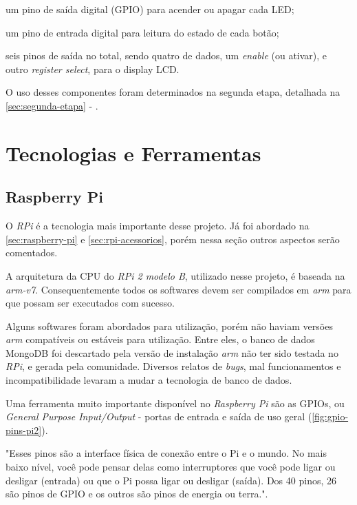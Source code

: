 \documentclass[
		12pt,				%
		openright,			%
		oneside,			%
		a4paper,			%
		chapter=TITLE,		%
		english,			%
		brazil				%
	]{abntex2}
\begin{document}
\begin{alineas}
	\item um pino de saída digital (GPIO) para acender ou apagar cada LED;
	\item um pino de entrada digital para leitura do estado de cada botão;
	\item seis pinos de saída no total, sendo quatro de dados, um \textit{enable} (ou ativar), e outro \textit{register select}, para o display LCD.
\end{alineas}

O uso desses componentes foram determinados na segunda etapa, detalhada na \autoref{sec:segunda-etapa} - .


\section{Tecnologias e Ferramentas}\label{sec:tecnologias-ferramentas}


\subsection{Raspberry Pi}\label{sec:rpi-tecnologia}

O \textit{RPi} é a tecnologia mais importante desse projeto. Já foi abordado na \autoref{sec:raspberry-pi} e \autoref{sec:rpi-acessorios}, porém nessa seção outros aspectos serão comentados.

A arquitetura da CPU do \textit{RPi 2 modelo B}, utilizado nesse projeto, é baseada na \textit{arm-v7}. Consequentemente todos os softwares devem ser compilados em \textit{arm} para que possam ser executados com sucesso. 

Alguns softwares foram abordados para utilização, porém não haviam versões \textit{arm} compatíveis ou estáveis para utilização. Entre eles, o banco de dados MongoDB foi descartado pela versão de instalação \textit{arm} não ter sido testada no \textit{RPi}, e gerada pela comunidade. Diversos relatos de \textit{bugs}, mal funcionamentos e incompatibilidade levaram a mudar a tecnologia de banco de dados.

Uma ferramenta muito importante disponível no \textit{Raspberry Pi} são as GPIOs, ou \textit{General Purpose Input/Output} - portas de entrada e saída de uso geral (\autoref{fig:gpio-pins-pi2}).  

\begin{citacao}
"Esses pinos são a interface física de conexão entre o Pi e o mundo. No mais baixo nível, você pode pensar delas como interruptores que você pode ligar ou desligar (entrada) ou que o Pi possa ligar ou desligar (saída). Dos 40 pinos, 26 são pinos de GPIO e os outros são pinos de energia ou terra.". \cite{rpi-gpio}
\end{citacao}
\end{document}
